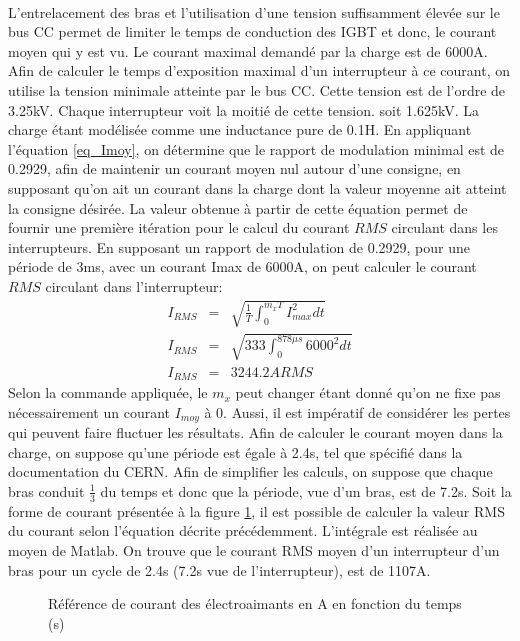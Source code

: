 \paragraph{}L'entrelacement des bras et l'utilisation d'une tension suffisamment élevée sur le bus CC permet de limiter le temps de conduction des IGBT et donc, le courant moyen qui y est vu. Le courant maximal demandé par la charge est de 6000A. Afin de calculer le temps d'exposition maximal d'un interrupteur à ce courant, on utilise la tension minimale atteinte par le bus CC. Cette tension est de l'ordre de 3.25kV. Chaque interrupteur voit la moitié de cette tension. soit 1.625kV. La charge étant modélisée comme une inductance pure de 0.1H. En appliquant l'équation \ref{eq_Imoy}, on détermine que le rapport de modulation minimal est de 0.2929, afin de maintenir un courant moyen nul autour d'une consigne, en supposant qu'on ait un courant dans la charge dont la valeur moyenne ait atteint la consigne désirée. La valeur obtenue à partir de cette équation permet de fournir une première itération pour le calcul du courant $RMS$ circulant dans les interrupteurs. En supposant un rapport de modulation de 0.2929, pour une période de 3ms, avec un courant Imax de 6000A, on peut calculer le courant $RMS$ circulant dans l'interrupteur:
\begin{eqnarray}
I_{RMS} &=& \sqrt{\frac{1}{T}\int_0^{m_xT}I_{max}^2 dt}\\
I_{RMS} &=& \sqrt{333\int_0^{878\mu s}6000^2 dt}\\
I_{RMS} &=& 3244.2A RMS
\end{eqnarray}
Selon la commande appliquée, le $m_x$ peut changer étant donné qu'on ne fixe pas nécessairement un courant $I_{moy}$ à 0. Aussi, il est impératif de considérer les pertes qui peuvent faire fluctuer les résultats. Afin de calculer le courant moyen dans la charge, on suppose qu'une période est égale à 2.4s, tel que spécifié dans la documentation du CERN. Afin de simplifier les calculs, on suppose que chaque bras conduit $\frac{1}{3}$ du temps et donc que la période, vue d'un bras, est de 7.2s. Soit la forme de courant présentée à la figure \ref{fig_ref_courant}, il est possible de calculer la valeur RMS du courant selon l'équation décrite précédemment. L'intégrale est réalisée au moyen de Matlab. On trouve que le courant RMS moyen d'un interrupteur d'un bras pour un cycle de 2.4s (7.2s vue de l'interrupteur), est de 1107A. 

\begin{figure}[htb]
\caption{Référence de courant des électroaimants en A en fonction du temps (s)}
\label{fig_ref_courant}
\end{figure}

